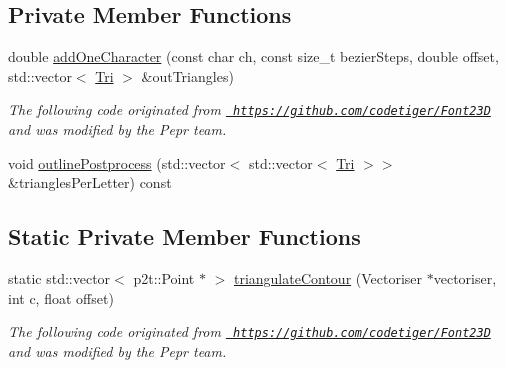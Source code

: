 \subsection*{Private Member Functions}
\begin{DoxyCompactItemize}
\item 
double \mbox{\hyperlink{classpepr3d_1_1_font_rasterizer_a478acb4e2249fe8f6d548e7c850196af}{add\+One\+Character}} (const char ch, const size\+\_\+t bezier\+Steps, double offset, std\+::vector$<$ \mbox{\hyperlink{structpepr3d_1_1_font_rasterizer_1_1_tri}{Tri}} $>$ \&out\+Triangles)
\begin{DoxyCompactList}\small\item\em The following code originated from \href{https://github.com/codetiger/Font23D}{\texttt{ https\+://github.\+com/codetiger/\+Font23D}} and was modified by the Pepr team. \end{DoxyCompactList}\item 
void \mbox{\hyperlink{classpepr3d_1_1_font_rasterizer_add285bc72f4611f6f74811978b877d68}{outline\+Postprocess}} (std\+::vector$<$ std\+::vector$<$ \mbox{\hyperlink{structpepr3d_1_1_font_rasterizer_1_1_tri}{Tri}} $>$$>$ \&triangles\+Per\+Letter) const
\end{DoxyCompactItemize}
\subsection*{Static Private Member Functions}
\begin{DoxyCompactItemize}
\item 
\mbox{\label{classpepr3d_1_1_font_rasterizer_ade535a9c18d7893a55d0520bee01b162}} 
static std\+::vector$<$ p2t\+::\+Point $\ast$ $>$ \mbox{\hyperlink{classpepr3d_1_1_font_rasterizer_ade535a9c18d7893a55d0520bee01b162}{triangulate\+Contour}} (Vectoriser $\ast$vectoriser, int c, float offset)
\begin{DoxyCompactList}\small\item\em The following code originated from \href{https://github.com/codetiger/Font23D}{\texttt{ https\+://github.\+com/codetiger/\+Font23D}} and was modified by the Pepr team. \end{DoxyCompactList}\end{DoxyCompactItemize}
